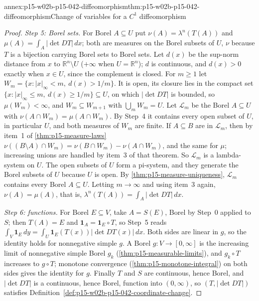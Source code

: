 \begin{annexitem}{annex:p15-w02b-p15-042-diffeomorphism}{thm:p15-w02b-p15-042-diffeomorphism}{Change of variables for a \(C^1\) diffeomorphism}
\begin{proof}
\emph{Step 5: Borel sets.} For Borel \(A\subseteq U\) put
\(\nu(A)=\lambda^n(T(A))\) and \(\mu(A)=\int_A|\det DT|\,dx\); both are
measures on the Borel subsets of \(U\), \(\nu\) because \(T\) is a bijection
carrying Borel sets to Borel sets. Let \(d(x)\) be the sup-norm distance
from \(x\) to \(\mathbb R^n\setminus U\) (\(+\infty\) when \(U=\mathbb R^n\));
\(d\) is continuous, and \(d(x)>0\) exactly when \(x\in U\), since the
complement is closed. For \(m\geq1\) let
\(W_m=\{x:|x|_\infty<m,\ d(x)>1/m\}\). It is open, its closure lies in the
compact set \(\{x:|x|_\infty\leq m,\ d(x)\geq1/m\}\subseteq U\), on which
\(|\det DT|\) is bounded, so \(\mu(W_m)<\infty\), and
\(W_m\subseteq W_{m+1}\) with \(\bigcup_mW_m=U\). Let \(\mathcal L_m\) be the
Borel \(A\subseteq U\) with \(\nu(A\cap W_m)=\mu(A\cap W_m)\). By Step~4 it
contains every open subset of \(U\), in particular \(U\), and both measures
of \(W_m\) are finite. If \(A\subseteq B\) are in \(\mathcal L_m\), then by
item~1 of \cref{thm:p15-measure-laws}
\(\nu((B\setminus A)\cap W_m)=\nu(B\cap W_m)-\nu(A\cap W_m)\), and the same
for \(\mu\); increasing unions are handled by item~3 of that theorem. So
\(\mathcal L_m\) is a lambda-system on \(U\). The open subsets of \(U\) form
a pi-system, and they generate the Borel subsets of \(U\) because \(U\) is
open. By \cref{thm:p15-measure-uniqueness}, \(\mathcal L_m\) contains every
Borel \(A\subseteq U\). Letting \(m\to\infty\) and using item~3 again,
\(\nu(A)=\mu(A)\), that is, \(\lambda^n(T(A))=\int_A|\det DT|\,dx\).

\emph{Step 6: functions.} For Borel \(E\subseteq V\), take \(A=S(E)\),
Borel by Step~0 applied to \(S\); then \(T(A)=E\) and
\(\mathbf 1_A=\mathbf 1_E\circ T\), so Step~5 reads
\(\int_V\mathbf 1_E\,dy=\int_U\mathbf 1_E(T(x))|\det DT(x)|\,dx\).
Both sides are linear in \(g\), so the identity holds for nonnegative simple
\(g\). A Borel \(g:V\to[0,\infty]\) is the increasing limit of nonnegative
simple Borel \(g_k\) (\cref{thm:p15-measurable-limits}), and
\(g_k\circ T\) increases to \(g\circ T\); monotone convergence
(\cref{thm:p15-monotone-integral}) on both sides gives the identity for
\(g\). Finally \(T\) and \(S\) are continuous, hence Borel, and
\(|\det DT|\) is a continuous, hence Borel, function into \((0,\infty)\), so
\((T,|\det DT|)\) satisfies Definition~\ref{def:p15-w02b-p15-042-coordinate-change}.
\end{proof}
\end{annexitem}

